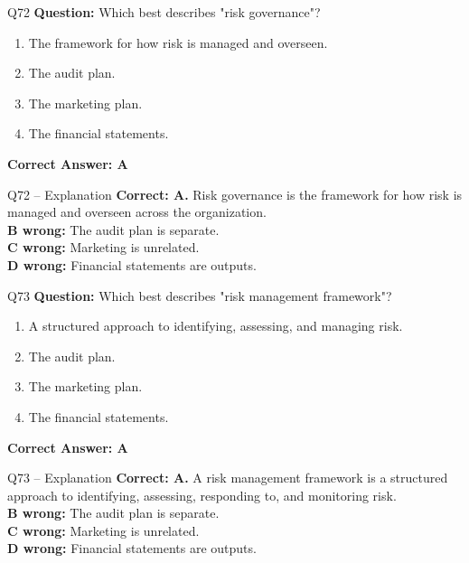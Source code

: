 \documentclass[aspectratio=169,10pt]{beamer}
\begin{document}
	\begin{frame}[t]{Q72}
		\small
		\textbf{Question:} Which best describes "risk governance"?
		\begin{enumerate}[label=\Alph*.,itemsep=1pt,topsep=2pt]
			\item The framework for how risk is managed and overseen.
			\item The audit plan.
			\item The marketing plan.
			\item The financial statements.
		\end{enumerate}
		\vspace{4pt}
		\textbf{Correct Answer: A}
	\end{frame}
	
	\begin{frame}[t]{Q72 -- Explanation}
		\small
		\textbf{Correct: A.} Risk governance is the framework for how risk is managed and overseen across the organization. \\[4pt]
		\textbf{B wrong:} The audit plan is separate. \\[2pt]
		\textbf{C wrong:} Marketing is unrelated. \\[2pt]
		\textbf{D wrong:} Financial statements are outputs.
	\end{frame}
	
	\begin{frame}[t]{Q73}
		\small
		\textbf{Question:} Which best describes "risk management framework"?
		\begin{enumerate}[label=\Alph*.,itemsep=1pt,topsep=2pt]
			\item A structured approach to identifying, assessing, and managing risk.
			\item The audit plan.
			\item The marketing plan.
			\item The financial statements.
		\end{enumerate}
		\vspace{4pt}
		\textbf{Correct Answer: A}
	\end{frame}
	
	\begin{frame}[t]{Q73 -- Explanation}
		\small
		\textbf{Correct: A.} A risk management framework is a structured approach to identifying, assessing, responding to, and monitoring risk. \\[4pt]
		\textbf{B wrong:} The audit plan is separate. \\[2pt]
		\textbf{C wrong:} Marketing is unrelated. \\[2pt]
		\textbf{D wrong:} Financial statements are outputs.
	\end{frame}
	
\end{document}
